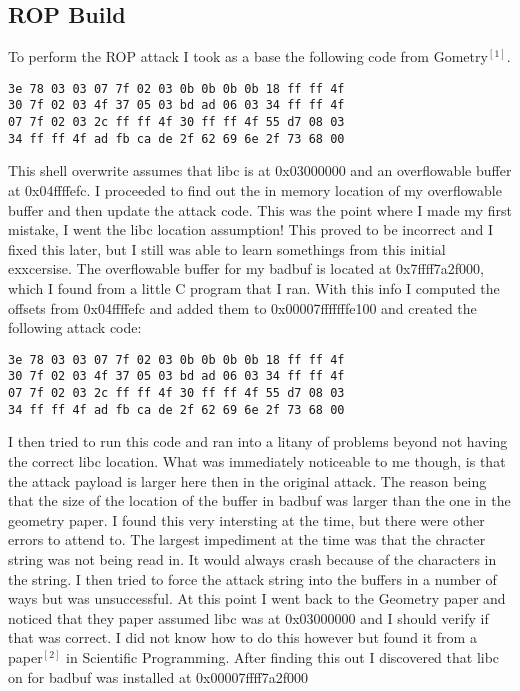 \documentclass[11pt]{amsart}
\begin{document}
\subsection*{ROP Build}
To perform the ROP attack I took as a base the following code from Gometry$^[1]$.
\begin{verbatim}
3e 78 03 03 07 7f 02 03 0b 0b 0b 0b 18 ff ff 4f 
30 7f 02 03 4f 37 05 03 bd ad 06 03 34 ff ff 4f 
07 7f 02 03 2c ff ff 4f 30 ff ff 4f 55 d7 08 03
34 ff ff 4f ad fb ca de 2f 62 69 6e 2f 73 68 00 
\end{verbatim}
This shell overwrite assumes that libc is at 0x03000000 and an overflowable buffer at 0x04ffffefc.  I proceeded to find out the in memory location of my overflowable buffer and then update the attack code.  This was the point where I made my first mistake, I went the libc location assumption!  This proved to be incorrect and I fixed this later, but I still was able to learn somethings from this initial exxcersise.  The overflowable buffer for my badbuf is located at 0x7ffff7a2f000, which I found from a little C program that I ran.  With this info I computed the offsets from 0x04ffffefc and added them to 0x00007fffffffe100 and created the following attack code:
\begin{verbatim}
3e 78 03 03 07 7f 02 03 0b 0b 0b 0b 18 ff ff 4f 
30 7f 02 03 4f 37 05 03 bd ad 06 03 34 ff ff 4f 
07 7f 02 03 2c ff ff 4f 30 ff ff 4f 55 d7 08 03
34 ff ff 4f ad fb ca de 2f 62 69 6e 2f 73 68 00 
\end{verbatim}
I then tried to run this code and ran into a litany of problems beyond not having the correct libc location.  What was immediately noticeable to me though, is that the attack payload is larger here then in the original attack.  The reason being that the size of the location of the buffer in badbuf was larger than the one in the geometry paper.  I found this very intersting at the time, but there were other errors to attend to.  The largest impediment at the time was that the chracter string was not being read in.  It would always crash because of the characters in the string.  I then tried to force the attack string into the buffers in a number of ways but was unsuccessful.
At this point I went back to the Geometry paper and noticed that they paper assumed libc was at 0x03000000 and I should verify if that was correct.  I did not know how to do this however but found it from a paper$^[2]$ in Scientific Programming.  After finding this out I discovered that libc on for badbuf was installed at 0x00007ffff7a2f000
\end{document}
